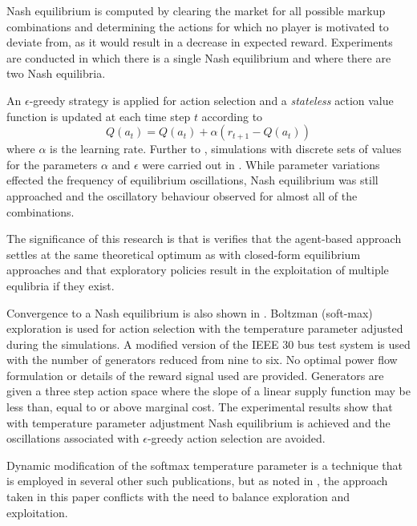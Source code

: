 Nash equilibrium is computed by clearing the market for all possible markup
combinations and determining the actions for which no player is motivated to
deviate from, as it would result in a decrease in expected reward. Experiments
are conducted in which there is a single Nash equilibrium and where there
are two Nash equilibria.

An $\epsilon$-greedy strategy \cite{suttonbarto:1998} is applied for action
selection and a \textit{stateless} action value function is updated at each time step $t$
according to
\begin{equation}
Q(a_t) = Q(a_t) + \alpha(r_{t+1} - Q(a_t))
\end{equation}
where $\alpha$ is the learning rate.  Further to ,
simulations with discrete sets of values for the parameters $\alpha$ and
$\epsilon$ were carried out in .  While parameter
variations effected the frequency of equilibrium oscillations, Nash equilibrium
was still approached and the oscillatory behaviour observed for almost all
of the combinations.

The significance of this research is that is verifies
that the agent-based approach settles at the same theoretical optimum as with closed-form
equilibrium approaches and that exploratory policies result in the exploitation
of multiple equlibria if they exist.

Convergence to a Nash equilibrium is also shown in .
Boltzman (soft-max) exploration is used for action selection with the temperature
parameter adjusted during the simulations.  A modified version of the IEEE 30
bus test system is used with the number of generators reduced from nine to
six.  No optimal power flow formulation or details of the reward signal used
are provided.  Generators are given a three step action space where the slope of a
linear supply function may be less than, equal to or above marginal cost.  The
experimental results show that with temperature parameter adjustment Nash
equilibrium is achieved and the oscillations associated with $\epsilon$-greedy
action selection are avoided.

Dynamic modification of the softmax temperature parameter is a technique that
is employed in several other such publications, but as noted in
, the approach taken in this paper conflicts with
the need to balance exploration and exploitation.


